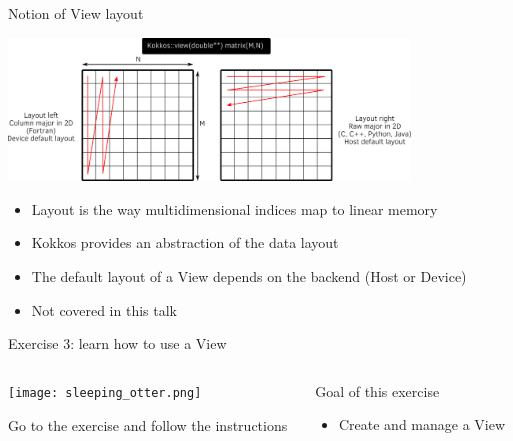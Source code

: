\documentclass[aspectratio=169]{beamer}
\begin{document}

\begin{frame}{Notion of View layout}
    \begin{center}
        \includegraphics[width=0.8\textwidth]{layout_right_left.png}
    \end{center}
    \begin{itemize}
        \item Layout is the way multidimensional indices map to linear memory
        \item Kokkos provides an abstraction of the data layout
        \item The default layout of a View depends on the backend (Host or Device)
        \item Not covered in this talk
    \end{itemize}
\end{frame}


\begin{exerciseframe}{Exercise 3: learn how to use a View}
    \begin{columns}
        \begin{column}{0.5\linewidth}
            \begin{center}
                \texttt{[image: sleeping\_otter.png]}
            \end{center}

            Go to the exercise  and follow the instructions
        \end{column}
        \begin{column}{0.5\linewidth}
            \begin{block}{Goal of this exercise}
                \begin{itemize}
                    \item Create and manage a View
                \end{itemize}
            \end{block}
        \end{column}
    \end{columns}
\end{exerciseframe}
\end{document}
